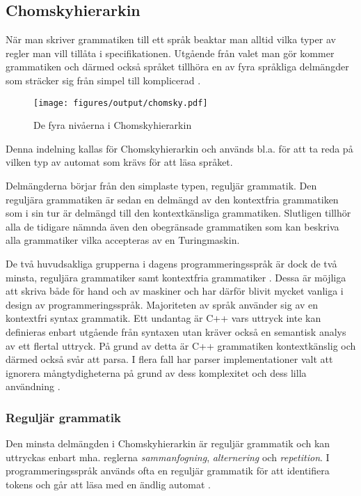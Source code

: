 \subsection{Chomskyhierarkin}

När man skriver grammatiken till ett språk beaktar man alltid vilka
typer av regler man vill tillåta i specifikationen. Utgående från valet man
gör kommer grammatiken och därmed också språket tillhöra en av fyra språkliga
delmängder som sträcker sig från simpel till komplicerad \citep[s. 19]{gd08}.

\begin{figure}[ht]
  \texttt{[image: figures/output/chomsky.pdf]}
  \caption{De fyra nivåerna i Chomskyhierarkin}
\end{figure}

Denna indelning kallas för Chomskyhierarkin och används bl.a. för att ta reda
på vilken typ av automat som krävs för att läsa språket.

Delmängderna börjar från den simplaste typen, reguljär grammatik. Den
reguljära grammatiken är sedan en delmängd av den kontextfria grammatiken som i
sin tur är delmängd till den kontextkänsliga grammatiken. Slutligen tillhör
alla de tidigare nämnda även den obegränsade grammatiken som kan
beskriva alla grammatiker vilka accepteras av en Turingmaskin.

De två huvudsakliga grupperna i dagens programmeringsspråk är dock de två
minsta, reguljära grammatiker samt kontextfria grammatiker \citep[s.
100]{sm09}. Dessa är möjliga att skriva både för hand och av maskiner och har
därför blivit mycket vanliga i design av programmeringsspråk. Majoriteten av
språk använder sig av en kontextfri syntax grammatik. Ett undantag är C++ vars
uttryck inte kan definieras enbart utgående från syntaxen utan kräver också en
semantisk analys av ett flertal uttryck. På grund av detta är C++ grammatiken
kontextkänslig och därmed också svår att parsa. I flera fall har parser
implementationer valt att ignorera mångtydigheterna på grund av dess
komplexitet och dess lilla användning \citep[s. 2]{rt05}.

\subsubsection{Reguljär grammatik}

Den minsta delmängden i Chomskyhierarkin är reguljär grammatik och kan uttryckas
enbart mha. reglerna \textit{sammanfogning}, \textit{alternering} och
\textit{repetition}. I programmeringsspråk används ofta en reguljär grammatik
för att identifiera tokens och går att läsa med en ändlig automat \citep[s.
100]{sm09}.

